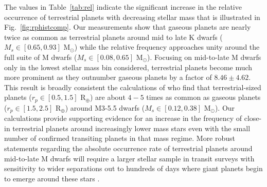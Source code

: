 \documentclass[twocolumn]{emulateapj}
\begin{document}


The values in Table~\ref{tab:rel} indicate the significant increase in the relative occurrence of terrestrial
planets with decreasing stellar mass that is illustrated in Fig.~\ref{fig:rphistcomp}. Our measurements show
that gaseous planets are nearly twice as common as terrestrial planets
around mid to late K dwarfs ($M_s \in [0.65,0.93]$ M$_{\odot}$) while the relative frequency approaches unity
around the full suite of M dwarfs ($M_s \in [0.08,0.65]$ M$_{\odot}$). Focusing on mid-to-late M dwarfs only in
the lowest stellar mass bin considered, terrestrial planets become much more prominent as they outnumber gaseous
planets by a factor of $8.46\pm 4.62$. This result is broadly
consistent the calculations of \cite{hardegree19} who find that terrestrial-sized 
planets ($r_p \in[0.5,1.5]$ R$_{\oplus}$) are about $4-5$ times as common as gaseous planets ($r_p \in [1.5,2.5]$
R$_{\oplus}$) around M3-5.5 dwarfs ($M_s \in [0.12,0.38]$ M$_{\odot}$). 
Our calculations provide supporting evidence for an increase in the frequency of close-in terrestrial planets
around increasingly lower mass stars even with the small number of confirmed transiting planets in that mass
regime. More robust statements regarding the absolute occurrence rate of terrestrial planets around mid-to-late
M dwarfs will require a larger stellar sample in transit surveys with sensitivity to wider separations out to
hundreds of days where giant planets begin to emerge around these stars \citep{bonfils13,morales19}.
\end{document}
